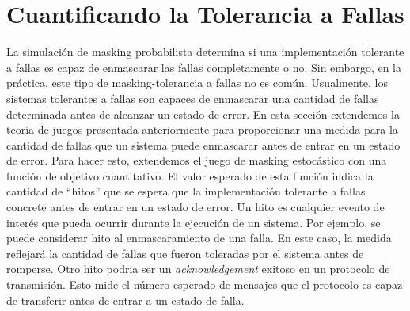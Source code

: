 \section{Cuantificando la Tolerancia a Fallas} \label{sec:almost_sure_prob}

La simulación de masking probabilista determina si una implementación tolerante a fallas es capaz de enmascarar las fallas completamente o no. Sin embargo, en la práctica, este tipo de masking-tolerancia a fallas no es común. Usualmente, los sistemas tolerantes a fallas son capaces de enmascarar una cantidad de fallas determinada antes de alcanzar un estado de error.
%
%
En esta sección extendemos la teoría de juegos presentada anteriormente para proporcionar una medida para la cantidad de fallas que un sistema puede enmascarar antes de entrar en un estado de error.
%
Para hacer esto, extendemos el juego de masking estocástico con una función de objetivo cuantitativo.
El valor esperado de esta función indica la cantidad de ``hitos'' que se espera que la implementación tolerante a fallas concrete antes de entrar en un estado de error.  Un hito es cualquier evento de interés que pueda ocurrir durante la ejecución de un sistema.  Por ejemplo, se puede considerar hito al enmascaramiento de una falla.
En este caso, la medida reflejará la cantidad de fallas que fueron toleradas por el sistema antes de romperse. Otro hito podria ser un \textit{acknowledgement} exitoso en un protocolo de transmisión. Esto mide el número esperado de mensajes que el protocolo es capaz de transferir antes de entrar a un estado de falla.

